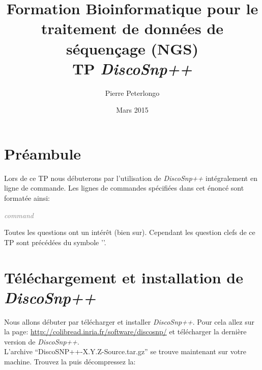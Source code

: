 
\usepackage{array}
\usepackage{url}
\usepackage{moreverb}
\usepackage{verbatim}
\usepackage[utf8]{inputenc}
\usepackage[T1]{fontenc}
\usepackage{xcolor}
\usepackage{xspace}
\usepackage{pifont}
\newcommand{\discopp}{{\it DiscoSnp++}\xspace}
\newcommand{\code}[1]{\begin{center} \textcolor{gray}{{\emph{#1}}} \end{center}} 
\newcommand{\sligne}{\begin{center} \begin{tabular}{c}~~~~~~~~~~~~~~~~~~~~~~~~~~~~~~~~~~~~~~\\ \hline\\\end{tabular}\end{center}}


\title{Formation Bioinformatique pour le traitement de données de séquençage (NGS)\\
TP \discopp}
\date{Mars 2015} 
\author{Pierre Peterlongo}
\maketitle
\textbf{}

\section*{Préambule} %
\label{sec:preambule}
Lors de ce TP nous débuterons par l'utilisation de \discopp intégralement en ligne de commande. Les lignes de commandes spécifiées dans cet énoncé sont formatée ainsi:
\code{command}

Toutes les questions ont un intérêt (bien sur). Cependant les question clefs de ce TP sont précédées du symbole ''.

\section*{Téléchargement et installation de \discopp} %
\label{sec:telechargement_et_installation}
Nous allons débuter par télécharger et installer \discopp. Pour cela allez sur la page: \url{http://colibread.inria.fr/software/discosnp/} et télécharger la dernière version de \discopp. \\

L'archive ``DiscoSNP++-X.Y.Z-Source.tar.gz'' se trouve maintenant sur votre machine. Trouvez la puis décompressez la:


